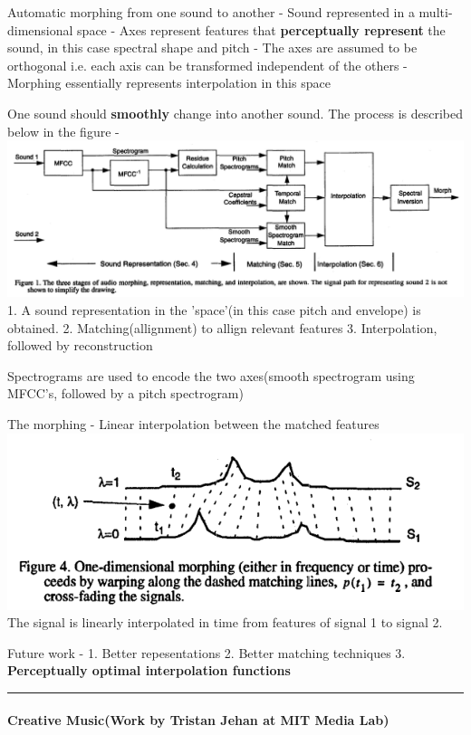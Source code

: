\documentclass[11pt]{article}
\makeatletter
\def\maxwidth{\ifdim\Gin@nat@width>\linewidth\linewidth
    \else\Gin@nat@width\fi}
\let\Oldincludegraphics\includegraphics
\renewcommand{\includegraphics}[1]{\Oldincludegraphics[width=.8\maxwidth]{#1}}
\makeatother
\begin{document}
    Automatic morphing from one sound to another - Sound represented in a
multi-dimensional space - Axes represent features that
\textbf{perceptually represent} the sound, in this case spectral shape
and pitch - The axes are assumed to be orthogonal i.e. each axis can be
transformed independent of the others - Morphing essentially represents
interpolation in this space

    One sound should \textbf{smoothly} change into another sound. The
process is described below in the figure - \includegraphics{fig_12.PNG}
1. A sound representation in the 'space'(in this case pitch and
envelope) is obtained. 2. Matching(allignment) to allign relevant
features 3. Interpolation, followed by reconstruction

Spectrograms are used to encode the two axes(smooth spectrogram using
MFCC's, followed by a pitch spectrogram)

    The morphing - Linear interpolation between the matched features
\includegraphics{fig_13.PNG} The signal is linearly interpolated in time
from features of signal 1 to signal 2.

    Future work - 1. Better repesentations 2. Better matching techniques 3.
\textbf{Perceptually optimal interpolation functions}

    \begin{center}\rule{0.5\linewidth}{\linethickness}\end{center}

\paragraph{Creative Music(Work by Tristan Jehan at MIT Media
Lab)}\label{creative-musicwork-by-tristan-jehan-at-mit-media-lab}
\end{document}

